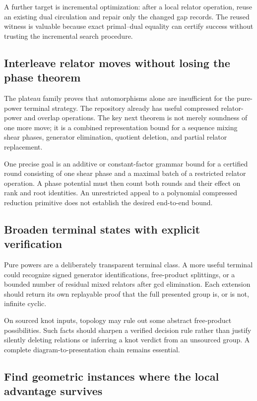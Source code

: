 \documentclass[11pt,letterpaper]{article}
\theoremstyle{definition}
\theoremstyle{remark}\newtheorem{remark}[theorem]{Remark}
\begin{document}
A further target is incremental optimization: after a local relator operation,
reuse an existing dual circulation and repair only the changed gap records.
The reused witness is valuable because exact primal--dual equality can certify
success without trusting the incremental search procedure.

\subsection{Interleave relator moves without losing the phase theorem}

The plateau family proves that automorphisms alone are insufficient for the
pure-power terminal strategy. The repository already has useful compressed
relator-power and overlap operations. The key next theorem is not merely
soundness of one more move; it is a combined representation bound for a
sequence mixing shear phases, generator elimination, quotient deletion, and
partial relator replacement.

One precise goal is an additive or constant-factor grammar bound for a
certified round consisting of one shear phase and a maximal batch of a
restricted relator operation. A phase potential must then count both rounds
and their effect on rank and root identities. An unrestricted appeal to a
polynomial compressed reduction primitive does not establish the desired
end-to-end bound.

\subsection{Broaden terminal states with explicit verification}

Pure powers are a deliberately transparent terminal class. A more useful
terminal could recognize signed generator identifications, free-product
splittings, or a bounded number of residual mixed relators after gcd
elimination. Each extension should return its own replayable proof that the
full presented group is, or is not, infinite cyclic.

On sourced knot inputs, topology may rule out some abstract free-product
possibilities. Such facts should sharpen a verified decision rule rather than
justify silently deleting relations or inferring a knot verdict from an
unsourced group. A complete diagram-to-presentation chain remains essential.

\subsection{Find geometric instances where the local advantage survives}
\end{document}
